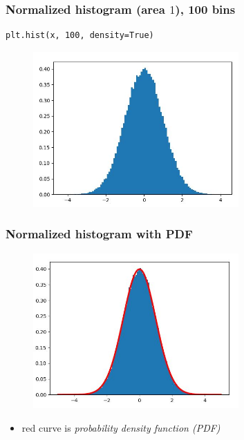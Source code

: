 \documentclass[english,14pt]{beamer}
\newcommand\red[1]{{\color{red} #1}}
\begin{document}

\begin{frame}[fragile]

\frametitle{Normalized histogram (area $1$), 100 bins}

\begin{lstlisting}[style=CStyle,basicstyle=\scriptsize]
plt.hist(x, 100, density=True)
\end{lstlisting}

\begin{figure}[ht]
	\centering
	\includegraphics[width=0.7\textwidth]{figures/hist100BinsDensity}
\end{figure}

\end{frame}


\begin{frame}[fragile]

\frametitle{Normalized histogram with PDF}

\begin{figure}[ht]
	\centering
	\includegraphics[width=0.7\textwidth]{figures/histWithpdf}
\end{figure}

\begin{itemize}
	\item[] red curve is \red{\emph{probability density function (PDF)}}
\end{itemize}

\end{frame}
\end{document}
